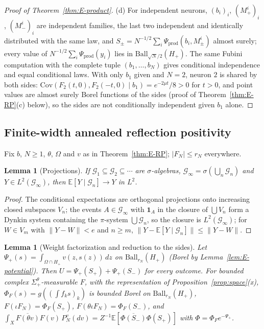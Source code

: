 \documentclass[11pt]{article}
\theoremstyle{plain}
\newtheorem{lemma}[theorem]{Lemma}
\theoremstyle{definition}
\theoremstyle{remark}
\newcommand{\E}{\mathbb{E}}
\newcommand{\cG}{\mathcal{G}}
\newcommand{\ind}{\mathbf{1}}
\newcommand{\Ball}{\mathrm{Ball}}
\newcommand{\conj}[1]{\overline{#1}}
\begin{document}
\begin{proof}[Proof of Theorem~\ref{thm:E-product}]
(d) For independent neurons, $(b_i)_i$, $(M^{i}_{+})_i$, $(M^{i}_{-})_i$ are independent families, the
last two independent and identically distributed with the same law, and
$S_\pm=N^{-1/2}\sum_i\Psi_{\mathrm{prod}}(b_i,M^{i}_{\pm})$ almost surely; every value of
$N^{-1/2}\sum_i\Psi_{\mathrm{prod}}(y_i)$ lies in $\Ball_{\sqrt N/2}(H_+)$. The same Fubini computation with the
complete tuple $(b_1,\dots,b_N)$ gives conditional independence and equal conditional
laws. With only $b_1$ given and $N=2$, neuron $2$ is shared by both sides:
$\mathrm{Cov}(F_2(t,0),F_2(-t,0)\mid b_1)=e^{-2\mu t}/8>0$ for $t>0$, and point values are almost surely
Borel functions of the sides (proof of Theorem~\ref{thm:E-RP}(c) below), so the sides
are not conditionally independent given $b_1$ alone.
\end{proof}

\subsection{Finite-width annealed reflection positivity}

Fix $b$, $N\ge1$, $\theta$, $\Omega$ and $v$ as in Theorem~\ref{thm:E-RP}; $|F_N|\le r_N$ everywhere.

\begin{lemma}[Projections]\label{lem:E-projections}
If $\cG_1\subseteq\cG_2\subseteq\cdots$ are $\sigma$-algebras, $\cG_\infty=\sigma(\bigcup_n\cG_n)$ and $Y\in L^{2}(\cG_\infty)$, then
$\E[Y\mid\cG_n]\to Y$ in $L^{2}$.
\end{lemma}

\begin{proof}
The conditional expectations are orthogonal projections onto increasing closed
subspaces $V_n$; the events $A\in\cG_\infty$ with $\ind_A$ in the closure of $\bigcup V_n$ form a
Dynkin system containing the $\pi$-system $\bigcup\cG_n$, so the closure is $L^{2}(\cG_\infty)$; for
$W\in V_m$ with $\|Y-W\|<e$ and $n\ge m$, $\|Y-\E[Y\mid\cG_n]\|\le\|Y-W\|$.
\end{proof}

\begin{lemma}[Weight factorization and reduction to the sides]\label{lem:E-factor}
Let $\Psi_+(s)=\int_{\Omega\cap H_+}v(z,s(z))\,dz$ on $\Ball_{r_N}(H_+)$ (Borel by
Lemma~\ref{lem:E-potential}). Then $U=\Psi_+(S_+)+\Psi_+(S_-)$ for every outcome. For bounded
complex $\Sigma^{\theta}_{+}$-measurable $F$, with the representation of
Proposition~\ref{prop:space}(x), $\Phi_F(s)=g((\int f_ks)_k)$ is bounded Borel on $\Ball_{r_N}(H_+)$,
$F(\iota F_N)=\Phi_F(S_+)$, $F(\theta\iota F_N)=\Phi_F(S_-)$, and
$\int_X\conj{F(\theta v)}F(v)\,P^{v}_{N}(dv)=Z^{-1}\E[\conj{\Phi(S_-)}\Phi(S_+)]$ with $\Phi=\Phi_Fe^{-\Psi_+}$.
\end{lemma}
\end{document}
